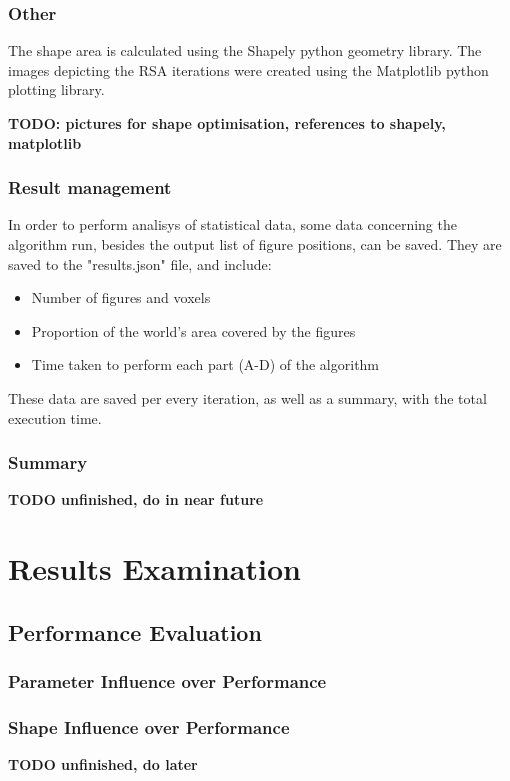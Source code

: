 \documentclass[12pt, oneside]{report}
\begin{document}
\subsection{Other}

The shape area is calculated using the Shapely python geometry library.\autocite[1]{shapely} \newline
The images depicting the RSA iterations were created using the Matplotlib python plotting library.\autocite[1]{matplotlib}

\textbf{TODO: pictures for shape optimisation, references to shapely, matplotlib}

\subsection{Result management}

In order to perform analisys of statistical data, some data concerning the algorithm run, besides the output list of figure positions, can be saved. They are saved to the "results.json" file, and include:
\begin{itemize}
  \item Number of figures and voxels
 	\item Proportion of the world's area covered by the figures
	\item Time taken to perform each part (A-D) of the algorithm
\end{itemize}
These data are saved per every iteration, as well as a summary, with the total execution time.

\subsection{Summary}

\textbf{TODO unfinished, do in near future}


\chapter{Results Examination}
\section{Performance Evaluation}
\subsection{Parameter Influence over Performance}
\subsection{Shape Influence over Performance}
\textbf{ TODO unfinished, do later}


\newpage
\printbibliography
\end{document}
